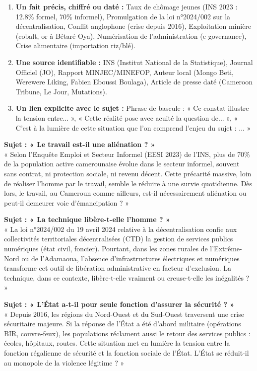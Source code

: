 \documentclass[11pt]{article}
\begin{document}
\begin{methode}
\begin{enumerate}
    \item \textbf{Un fait précis, chiffré ou daté :} Taux de chômage jeunes (INS 2023 : \num{12,8}\% formel, \num{70}\% informel), Promulgation de la loi n°2024/002 sur la décentralisation, Conflit anglophone (crise depuis 2016), Exploitation minière (cobalt, or à Bétaré-Oya), Numérisation de l'administration (e-governance), Crise alimentaire (importation riz/blé).
    \item \textbf{Une source identifiable :} INS (Institut National de la Statistique), Journal Officiel (JO), Rapport MINJEC/MINEFOP, Auteur local (Mongo Beti, Werewere Liking, Fabien Eboussi Boulaga), Article de presse daté (Cameroon Tribune, Le Jour, Mutations).
    \item \textbf{Un lien explicite avec le sujet :} Phrase de bascule : « Ce constat illustre la tension entre... », « Cette réalité pose avec acuité la question de... », « C'est à la lumière de cette situation que l'on comprend l'enjeu du sujet : ... »
\end{enumerate}
\end{methode}

\begin{exemplebox}
\textbf{Sujet : « Le travail est-il une aliénation ? »} \\
« Selon l'Enquête Emploi et Secteur Informel (EESI 2023) de l'INS, plus de \num{70}\% de la population active camerounaise évolue dans le secteur informel, souvent sans contrat, ni protection sociale, ni revenu décent. Cette précarité massive, loin de réaliser l'homme par le travail, semble le réduire à une survie quotidienne. Dès lors, le travail, au Cameroun comme ailleurs, est-il nécessairement aliénation ou peut-il demeurer voie d'émancipation ? »

\textbf{Sujet : « La technique libère-t-elle l'homme ? »} \\
« La loi n°2024/002 du 19 avril 2024 relative à la décentralisation confie aux collectivités territoriales décentralisées (CTD) la gestion de services publics numériques (état civil, foncier). Pourtant, dans les zones rurales de l'Extrême-Nord ou de l'Adamaoua, l'absence d'infrastructures électriques et numériques transforme cet outil de libération administrative en facteur d'exclusion. La technique, dans ce contexte, libère-t-elle vraiment ou creuse-t-elle les inégalités ? »

\textbf{Sujet : « L'État a-t-il pour seule fonction d'assurer la sécurité ? »} \\
« Depuis 2016, les régions du Nord-Ouest et du Sud-Ouest traversent une crise sécuritaire majeure. Si la réponse de l'État a été d'abord militaire (opérations BIR, couvre-feux), les populations réclament aussi le retour des services publics : écoles, hôpitaux, routes. Cette situation met en lumière la tension entre la fonction régalienne de sécurité et la fonction sociale de l'État. L'État se réduit-il au monopole de la violence légitime ? »
\end{exemplebox}
\end{document}

